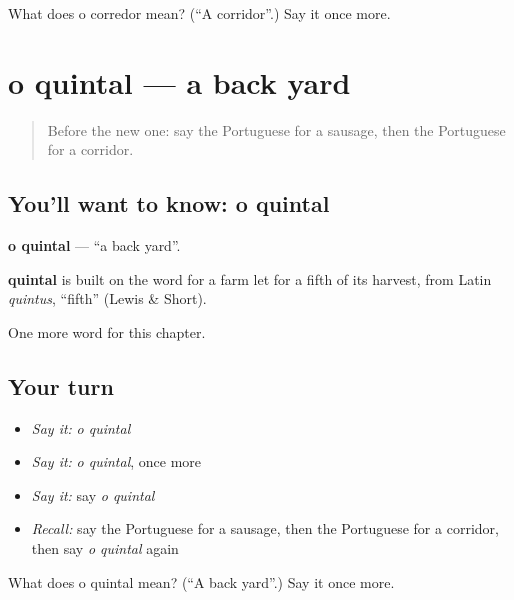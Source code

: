 \begin{tcolorbox}[breakable,colback=teal!4,colframe=teal!35!black,title={Before you move on}]
What does o corredor mean? (\textquotedblleft{}A corridor\textquotedblright{}.) Say it once more.
\end{tcolorbox}
\section[o quintal]{o quintal — a back yard}

\label{lesson:PT-C255-quintal}



\begin{quote}
Before the new one: say the Portuguese for a sausage, then the Portuguese for a corridor.
\end{quote}

\subsection*{You'll want to know: o quintal}
\textbf{o quintal} — \textquotedblleft{}a back yard\textquotedblright{}.

\begin{cousinweb}
\textbf{quintal} is built on the word for a farm let for a fifth of its harvest, from Latin \emph{quintus}, \textquotedblleft{}fifth\textquotedblright{} (Lewis \& Short).
\end{cousinweb}

\begin{grammarlens}[title={What you've built}]
One more word for this chapter.
\end{grammarlens}

\subsection*{Your turn}
\begin{itemize}
\raggedright
  \item \emph{Say it:} \emph{o quintal}
  \item \emph{Say it:} \emph{o quintal}, once more
  \item \emph{Say it:} say \emph{o quintal}
  \item \emph{Recall:} say the Portuguese for a sausage, then the Portuguese for a corridor, then say \emph{o quintal} again
\end{itemize}

\begin{tcolorbox}[breakable,colback=teal!4,colframe=teal!35!black,title={Before you move on}]
What does o quintal mean? (\textquotedblleft{}A back yard\textquotedblright{}.) Say it once more.
\end{tcolorbox}
